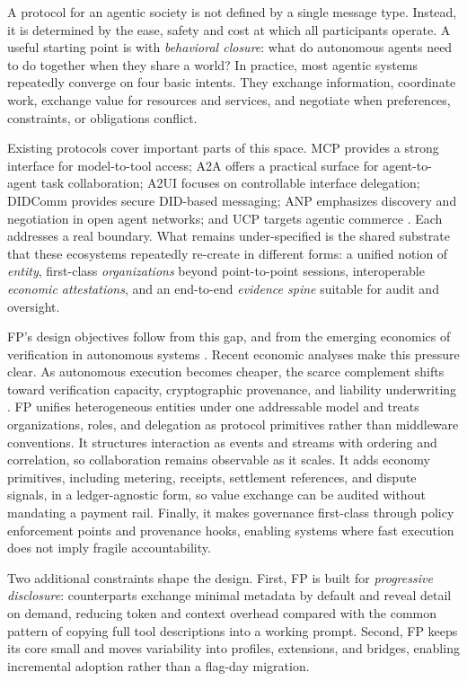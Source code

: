 \documentclass{llmxive}
\begin{document}
A protocol for an agentic society is not defined by a single message type. Instead, it is determined by the ease, safety and cost at which all participants operate. A useful starting point is with \emph{behavioral closure}: what do autonomous agents need to do together when they share a world? In practice, most agentic systems repeatedly converge on four basic intents. They exchange information, coordinate work, exchange value for resources and services, and negotiate when preferences, constraints, or obligations conflict.

Existing protocols cover important parts of this space. MCP provides a strong interface for model-to-tool access; A2A offers a practical surface for agent-to-agent task collaboration; A2UI focuses on controllable interface delegation; DIDComm provides secure DID-based messaging; ANP emphasizes discovery and negotiation in open agent networks; and UCP targets agentic commerce \cite{mcp_spec,a2a_spec,a2ui_spec,didcomm_spec,anp_paper,ucp_spec}. Each addresses a real boundary. What remains under-specified is the shared substrate that these ecosystems repeatedly re-create in different forms: a unified notion of \emph{entity}, first-class \emph{organizations} beyond point-to-point sessions, interoperable \emph{economic attestations}, and an end-to-end \emph{evidence spine} suitable for audit and oversight.

FP's design objectives follow from this gap, and from the emerging economics of verification in autonomous systems \cite{virtual_agent_economies}. 
Recent economic analyses make this pressure clear. As autonomous execution becomes cheaper, the scarce complement shifts toward verification capacity, cryptographic provenance, and liability underwriting \cite{agi_economics}.
FP unifies heterogeneous entities under one addressable model and treats organizations, roles, and delegation as protocol primitives rather than middleware conventions. It structures interaction as events and streams with ordering and correlation, so collaboration remains observable as it scales. It adds economy primitives, including metering, receipts, settlement references, and dispute signals, in a ledger-agnostic form, so value exchange can be audited without mandating a payment rail. Finally, it makes governance first-class through policy enforcement points and provenance hooks, enabling systems where fast execution does not imply fragile accountability.

Two additional constraints shape the design. First, FP is built for \emph{progressive disclosure}: counterparts exchange minimal metadata by default and reveal detail on demand, reducing token and context overhead compared with the common pattern of copying full tool descriptions into a working prompt. Second, FP keeps its core small and moves variability into profiles, extensions, and bridges, enabling incremental adoption rather than a flag-day migration.
\end{document}
